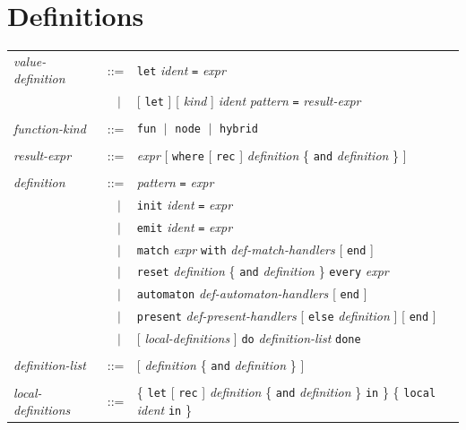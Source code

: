 \documentclass[11pt,titlepage,twoside]{report}
\newcommand{\alt}{\;|\;}
\newcommand{\Let}{\mbox{{\tt let}}}
\newcommand{\Rec}{\mbox{{\tt rec}}}
\newcommand{\In}{\mbox{{\tt in}}}
\newcommand{\And}{\mbox{{\tt and}}}
\newcommand{\Reset}{\mbox{{\tt reset}}}
\newcommand{\Every}{\mbox{{\tt every}}}
\newcommand{\Where}{\mbox{{\tt where}}}
\newcommand{\term}[1]{{\tt #1}}
\newcommand{\nterm}[1]{{\em #1}}
\begin{document}
\section{Definitions}
\label{definitions}
\begin{center}
\begin{tabular}{lcl}
\nterm{value-definition}
   & ::=        & \term{let} \nterm{ident} \term{=} \nterm{expr} \\
   & $\;\;\alt$ & [ \term{let} ] [ \nterm{kind} ] \nterm{ident} \nterm{pattern} \term{=}
                    \nterm{result-expr}
\\ \\
\nterm{function-kind} & ::=  & \term{fun} $\alt$ \term{node}
                                              $\alt$ \term{hybrid}
\\ \\
\nterm{result-expr}
& ::=    & \nterm{expr} [ \term{\Where} [ \term{\Rec} ]
  \nterm{definition} \{ \term{\And} \nterm{definition} \} ]
\\ \\
\nterm{definition} 
& ::=        & \nterm{pattern} \term{=} \nterm{expr} \\
   & $\;\;\alt$ & \term{init} \nterm{ident} \term{=} \nterm{expr} \\
   & $\;\;\alt$ & \term{emit} \nterm{ident} \term{=} \nterm{expr} \\
& $\;\;\alt$ & \term{match} \nterm{expr} \term{with}  
\nterm{def-match-handlers} [ \term{end} ]
\\
& $\;\;\alt$ & \term{\Reset} \nterm{definition}
               \{ \term{\And} \nterm{definition} \} \term{\Every} \nterm{expr}
                  \\
& $\;\;\alt$ & \term{automaton} \nterm{def-automaton-handlers}
                  [ \term{end} ]
                  \\
& $\;\;\alt$ & \term{present} \nterm{def-present-handlers}
                    [ \term{else} \nterm{definition} ] [ \term{end} ]
                  \\
& $\;\;\alt$ & [ \nterm{local-definitions} ]
                    \term{do} \nterm{definition-list} \term{done}
\\ \\
\nterm{definition-list}
   & ::=        & [ \nterm{definition} \{ \term{\And}
                  \nterm{definition} \} ]
\\ \\
\nterm{local-definitions}      
   & ::=        & \{ \term{\Let} [ \term{\Rec} ] \nterm{definition}
                  \{ \term{\And} \nterm{definition} \} \term{\In} \}
                  \{ \term{local} \nterm{ident} \term{in} \}
\end{tabular}
\end{center}
\end{document}
